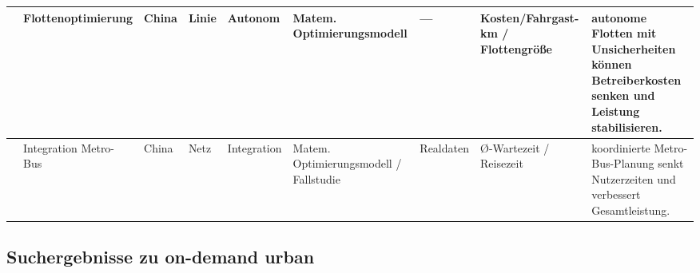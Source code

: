 \begin{landscape}
\begin{table}[p]
{\begin{tabular}{
        L{2.0cm}:
        L{2.5cm}:
        L{2.0cm}:
        L{2.0cm}:
        L{2.5cm}:
        L{2.3cm}:
        L{1.8cm}:
        L{2.6cm}:
        L{7.4cm}:
    }
      \textcite{tian_autonomous_2021} & Flottenoptimierung & China & Linie & Autonom & Matem. Optimierungsmodell & — & Kosten/Fahrgast-km / Flottengröße & autonome Flotten mit Unsicherheiten können Betreiberkosten senken und Leistung stabilisieren. \\ \hline
      \textcite{wei_optimizing_2020} & Integration Metro-Bus & China & Netz & Integration & Matem. Optimierungsmodell / Fallstudie & Realdaten & Ø-Wartezeit / Reisezeit & koordinierte Metro-Bus-Planung senkt Nutzerzeiten und verbessert Gesamtleistung. \\ \hline
    \end{tabular}
    }%
\end{table}
\end{landscape}


\subsection{Suchergebnisse zu on-demand urban}
